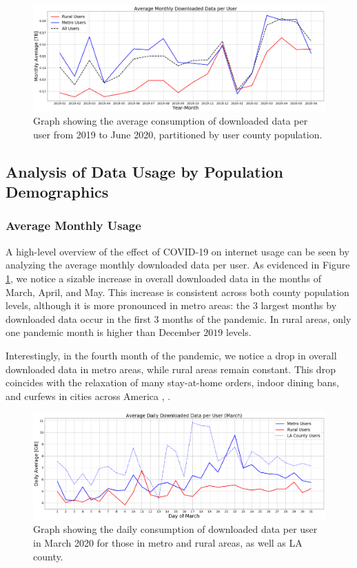 \begin{figure}
\centering
\includegraphics[width=1.0\linewidth]{figs/monthly_downloaded_data.png}
\caption{Graph showing the average consumption of downloaded data per user from 2019 to June 2020, partitioned by user county population.}
\label{fig:downloadmetro_rural}
\end{figure}

\subsection{Analysis of Data Usage by Population Demographics}

\subsubsection{Average Monthly Usage}
A high-level overview of the effect of COVID-19 on internet usage can be seen by analyzing the average monthly downloaded data per user. As evidenced in Figure \ref{fig:downloadmetro_rural}, we notice a sizable increase in overall downloaded data in the months of March, April, and May. This increase is consistent across both county population levels, although it is more pronounced in metro areas: the 3 largest months by downloaded data occur in the first 3 months of the pandemic. In rural areas, only one pandemic month is higher than December $2019$ levels.

Interestingly, in the fourth month of the pandemic, we notice a drop in overall downloaded data in metro areas, while rural areas remain constant. This drop coincides with the relaxation of many stay-at-home orders, indoor dining bans, and curfews in cities across America \cite{money2020la}, \cite{gov2020nyc}. 

\begin{figure}
\centering
\includegraphics[width=1.0\linewidth]{figs/daily_downloaded_data.png}
\caption{Graph showing the daily consumption of downloaded data per user in March 2020 for those in metro and rural areas, as well as LA county.}
\label{fig:dailymetro_rural}
\end{figure}

